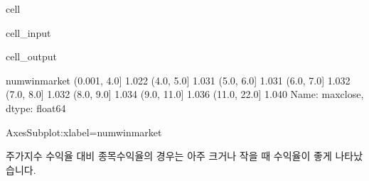 \documentclass[letterpaper,10pt,english]{jupyterBook}
\begin{document}
\begin{sphinxuseclass}{cell}\begin{sphinxVerbatimInput}

\begin{sphinxuseclass}{cell_input}
\begin{sphinxVerbatim}[commandchars=\\\{\}]
      
  \PYG{p}{[}\PYG{p}{]} 
\PYG{p}{[}\PYG{p}{]}
\PYG{p}{[}\PYG{p}{]}
\end{sphinxVerbatim}

\end{sphinxuseclass}\end{sphinxVerbatimInput}
\begin{sphinxVerbatimOutput}

\begin{sphinxuseclass}{cell_output}
\begin{sphinxVerbatim}[commandchars=\\\{\}]
num\PYGZus{}win\PYGZus{}market
(\PYGZhy{}0.001, 4.0]   1.022
(4.0, 5.0]      1.031
(5.0, 6.0]      1.031
(6.0, 7.0]      1.032
(7.0, 8.0]      1.032
(8.0, 9.0]      1.034
(9.0, 11.0]     1.036
(11.0, 22.0]    1.040
Name: max\PYGZus{}close, dtype: float64
\end{sphinxVerbatim}

\begin{sphinxVerbatim}[commandchars=\\\{\}]
\PYGZlt{}AxesSubplot:xlabel=\PYGZsq{}num\PYGZus{}win\PYGZus{}market\PYGZsq{}\PYGZgt{}
\end{sphinxVerbatim}

\noindent{}

\end{sphinxuseclass}\end{sphinxVerbatimOutput}

\end{sphinxuseclass}
\sphinxAtStartPar
 주가지수 수익율 대비 종목수익율의 경우는 아주 크거나 작을 때 수익율이 좋게 나타났습니다.
\end{document}
